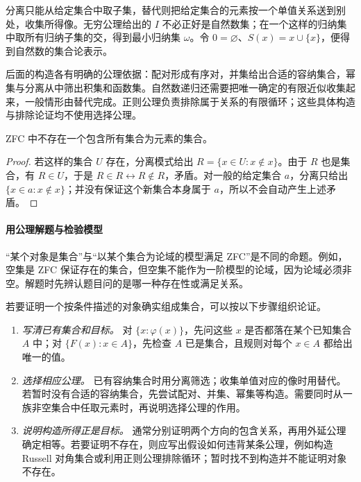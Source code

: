 \documentclass[lang=cn,a4paper,fontset=none,zihao=false,10pt,openany,twoside]{beautybook}
\numberwithin{algorithm}{chapter}
\begin{document}
\begin{remark}[分离与替代的作用]
分离只能从给定集合中取子集，替代则把给定集合的元素按一个单值关系送到别处，收集所得像。无穷公理给出的 $I$ 不必正好是自然数集；在一个这样的归纳集中取所有归纳子集的交，得到最小归纳集 $\omega$。令 $0=\varnothing$、$S(x)=x\cup\{x\}$，便得到自然数的集合论表示。

后面的构造各有明确的公理依据：配对形成有序对，并集给出合适的容纳集合，幂集与分离从中筛出积集和函数集。自然数递归还需要把唯一确定的有限近似收集起来，一般情形由替代完成。正则公理负责排除属于关系的有限循环；这些具体构造与排除论证均不使用选择公理。
\end{remark}

\begin{proposition}[不存在全体集合的集合]
ZFC 中不存在一个包含所有集合为元素的集合。
\end{proposition}
\begin{proof}
若这样的集合 $U$ 存在，分离模式给出 $R=\{x\in U:x\notin x\}$。由于 $R$ 也是集合，有 $R\in U$，于是 $R\in R\leftrightarrow R\notin R$，矛盾。对一般的给定集合 $a$，分离只给出 $\{x\in a:x\notin x\}$；并没有保证这个新集合本身属于 $a$，所以不会自动产生上述矛盾。
\end{proof}

\paragraph{用公理解题与检验模型}
“某个对象是集合”与“以某个集合为论域的模型满足 ZFC”是不同的命题。例如，空集是 ZFC 保证存在的集合，但空集不能作为一阶模型的论域，因为论域必须非空。解题时先辨认题目问的是哪一种存在性或满足关系。

若要证明一个按条件描述的对象确实组成集合，可以按以下步骤组织论证。
\begin{enumerate}[(1)]
\item \emph{写清已有集合和目标。} 对 $\{x:\varphi(x)\}$，先问这些 $x$ 是否都落在某个已知集合 $A$ 中；对 $\{F(x):x\in A\}$，先检查 $A$ 已是集合，且规则对每个 $x\in A$ 都给出唯一的值。
\item \emph{选择相应公理。} 已有容纳集合时用分离筛选；收集单值对应的像时用替代。若暂时没有合适的容纳集合，先尝试配对、并集、幂集等构造。需要同时从一族非空集合中任取元素时，再说明选择公理的作用。
\item \emph{说明构造所得正是目标。} 通常分别证明两个方向的包含关系，再用外延公理确定相等。若要证明不存在，则应写出假设如何违背某条公理，例如构造 Russell 对角集合或利用正则公理排除循环；暂时找不到构造并不能证明对象不存在。
\end{enumerate}
\end{document}
